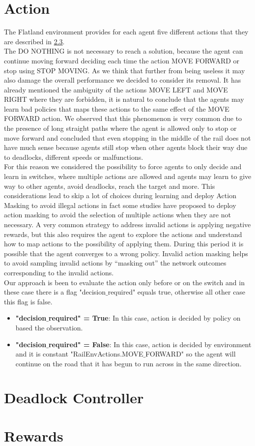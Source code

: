 \section{Action}
The Flatland environment provides for each agent five different actions that they are described in \hyperref[sec:envActions]{2.3}. \\ 
The DO NOTHING is not necessary to reach a solution, because the agent can continue moving forward deciding each time the action MOVE FORWARD or stop using STOP MOVING. As we think that further from being useless it may also damage the overall performance we decided to consider its removal. It has already mentioned the ambiguity of the actions MOVE LEFT and MOVE RIGHT where they are forbidden, it is natural to conclude that the agents may learn bad policies that maps these actions to the same effect of the MOVE FORWARD action. We observed that this phenomenon is very common due to the presence of long straight paths where the agent is allowed only to stop or move forward and concluded that even stopping in the middle of the rail does not have much sense because agents still stop when other agents block their way due to deadlocks, different speeds or malfunctions. \\
For this reason we considered the possibility to force agents to only decide and learn in switches, where multiple actions are allowed and agents may learn to give way to other agents, avoid deadlocks, reach the target and more. This considerations lead to skip a lot of choices during learning and deploy Action Masking to avoid illegal actions in fact some studies have proposed to deploy action masking to avoid the selection of multiple actions when they are not necessary. A very common strategy to address invalid actions is applying negative rewards, but this also requires the agent to explore the actions and understand how to map actions to the possibility of applying them. During this period it is possible that the agent converges to a wrong policy. Invalid action masking helps to avoid sampling invalid actions by “masking out” the network outcomes corresponding to the invalid actions. \\
Our approach is been to evaluate the action only before or on the switch and in these case there is a flag "decision$\_$required" equals true, otherwise all other case this flag is false. 
\begin{itemize}
\item \textbf{"decision$\_$required" = True}: In this case, action is decided by policy on based the observation.
\item \textbf{"decision$\_$required" = False}: In this case, action is decided by environment and it is constant "RailEnvActions.MOVE$\_$FORWARD" so the agent will continue on the road that it has begun to run across in the same direction.
\end{itemize}
\section{Deadlock Controller}
\section{Rewards}
	